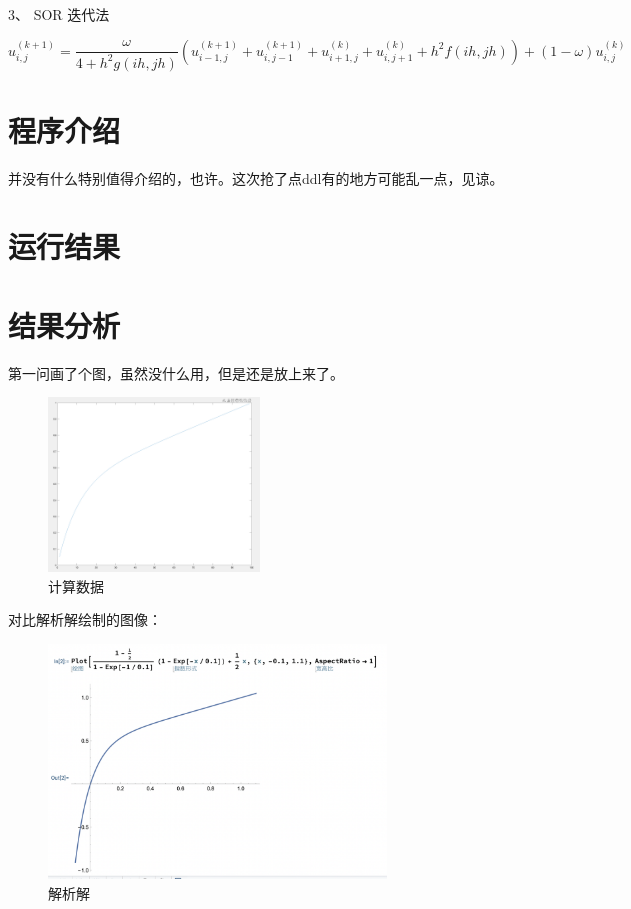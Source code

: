 \documentclass{article}
\begin{document}
3、 SOR 迭代法

\[
    u_{i,j}^{(k+1)} = \dfrac{\omega}{4 + h^2g(ih, jh)} (u_{i-1,j}^{(k+1)} + u_{i,j-1}^{(k+1)} + u_{i+1,j}^{(k)}+u_{i,j+1}^{(k)}+h^2f(ih, jh)) + (1-\omega) u_{i,j}^{(k)}
\]

\section{程序介绍}
并没有什么特别值得介绍的，也许。这次抢了点ddl有的地方可能乱一点，见谅。

\newpage
\section{运行结果}



\newpage
\section{结果分析}

第一问画了个图，虽然没什么用，但是还是放上来了。
\begin{figure}[h]
    \centering
    \includegraphics[width=0.5\textwidth]{img/4/matlab.png}
    \caption{计算数据}
\end{figure}

对比解析解绘制的图像：

\begin{figure}[h]
    \centering
    \includegraphics[width=0.8\textwidth]{img/4/mathematica.png}
    \caption{解析解}
\end{figure}
\end{document}
